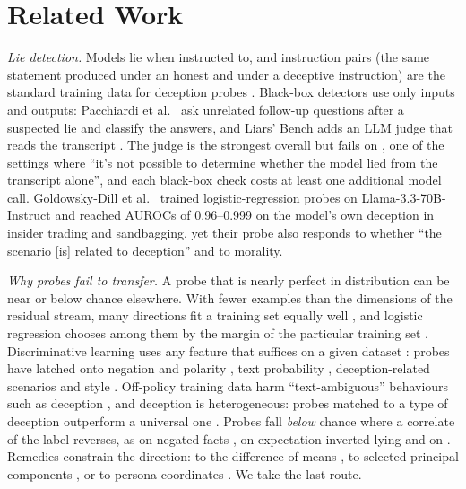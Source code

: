\section{Related Work}
\label{sec:related}

\emph{Lie detection.} Models lie when instructed to, and instruction pairs (the same statement produced
under an honest and under a deceptive instruction) are the standard training data for deception probes
\cite{zou2023representation,goldowskydill2025detecting}. Black-box detectors use only inputs and
outputs: Pacchiardi et al.~\cite{pacchiardi2023catch} ask unrelated follow-up questions after a
suspected lie and classify the answers, and Liars' Bench adds an LLM judge that reads the transcript
\cite{kretschmar2025liars}. The judge is the strongest overall but fails on \hpkr, one of the settings
where ``it's not possible to determine whether the model lied from the transcript alone'', and each
black-box check costs at least one additional model call. Goldowsky-Dill et
al.~\cite{goldowskydill2025detecting} trained logistic-regression probes on Llama-3.3-70B-Instruct
and reached AUROCs of 0.96--0.999 on the model's own deception in insider trading and sandbagging, yet
their probe also responds to whether ``the scenario [is] related to deception'' and to morality.

\emph{Why probes fail to transfer.} A probe that is nearly perfect in distribution can be near or below
chance elsewhere. With fewer examples than the dimensions of the residual stream, many directions fit
a training set equally well \cite{damour2022underspecification}, and logistic regression chooses among
them by the margin of the particular training set \cite{soudry2018implicit}. Discriminative learning
uses any feature that suffices on a given dataset \cite{geirhos2020shortcut}: probes have latched onto
negation and polarity \cite{levinstein2025still,buerger2024truth}, text probability
\cite{marks2023geometry}, deception-related scenarios \cite{goldowskydill2025detecting} and style
\cite{kumar2026pressure}. Off-policy training data harm ``text-ambiguous'' behaviours such as deception
\cite{kirch2025offpolicy}, and deception is heterogeneous: probes matched to a type of deception
outperform a universal one \cite{natarajan2026targeted}. Probes fall \emph{below} chance where a
correlate of the label reverses, as on negated facts \cite{levinstein2025still}, on
expectation-inverted lying \cite{ying2026truthfulness} and on \hpkr{}
\cite{kretschmar2025liars,moustafa2026beyond}. Remedies constrain the direction: to the difference of
means \cite{marks2023geometry}, to selected principal components \cite{yoo2026subspace}, or to persona
coordinates \cite{mahadik2026persona}. We take the last route.

